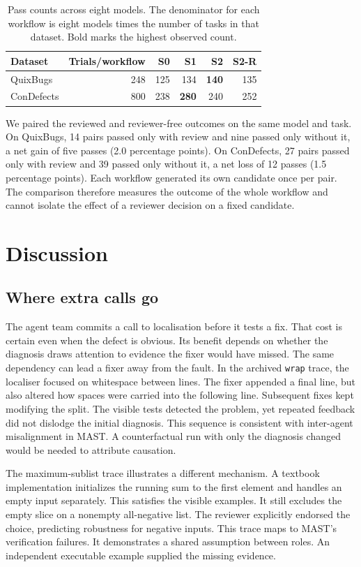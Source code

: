 \documentclass[conference]{IEEEtran}
\begin{document}
\begin{table}[ht]
\centering\small
\caption{Pass counts across eight models. The denominator for each workflow is eight models times the number of tasks in that dataset. Bold marks the highest observed count.}
\label{tab:workflow-comparison}
\begin{tabular}{lrrrrr}\toprule
Dataset & Trials/workflow & S0 & S1 & S2 & S2-R\\\midrule
QuixBugs & 248 & 125 & 134 & \textbf{140} & 135\\
ConDefects & 800 & 238 & \textbf{280} & 240 & 252\\\bottomrule
\end{tabular}
\end{table}

We paired the reviewed and reviewer-free outcomes on the same model and task. On QuixBugs, 14 pairs passed only with review and nine passed only without it, a net gain of five passes (2.0 percentage points). On ConDefects, 27 pairs passed only with review and 39 passed only without it, a net loss of 12 passes (1.5 percentage points). Each workflow generated its own candidate once per pair. The comparison therefore measures the outcome of the whole workflow and cannot isolate the effect of a reviewer decision on a fixed candidate.

\section{Discussion}
\subsection{Where extra calls go}
The agent team commits a call to localisation before it tests a fix. That cost is certain even when the defect is obvious. Its benefit depends on whether the diagnosis draws attention to evidence the fixer would have missed. The same dependency can lead a fixer away from the fault. In the archived \texttt{wrap} trace, the localiser focused on whitespace between lines. The fixer appended a final line, but also altered how spaces were carried into the following line. Subsequent fixes kept modifying the split. The visible tests detected the problem, yet repeated feedback did not dislodge the initial diagnosis. This sequence is consistent with inter-agent misalignment in MAST. A counterfactual run with only the diagnosis changed would be needed to attribute causation.

The maximum-sublist trace illustrates a different mechanism. A textbook implementation initializes the running sum to the first element and handles an empty input separately. This satisfies the visible examples. It still excludes the empty slice on a nonempty all-negative list. The reviewer explicitly endorsed the choice, predicting robustness for negative inputs. This trace maps to MAST's verification failures. It demonstrates a shared assumption between roles. An independent executable example supplied the missing evidence.
\end{document}

